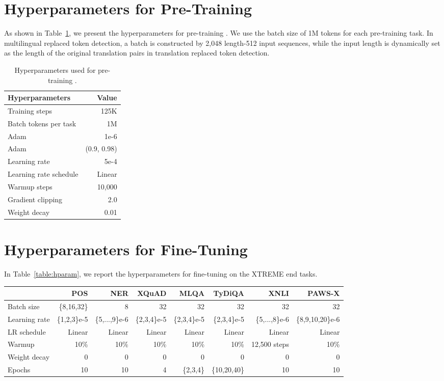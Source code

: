 \documentclass[11pt]{article}
\newcommand\our{\makebox{\textsc{XLM-E}}}
\begin{document}
\section{Hyperparameters for Pre-Training}
\label{appendix:params_pretrain}
As shown in Table~\ref{table:pt-hparam}, we present the hyperparameters for pre-training \our{}.
We use the batch size of 1M tokens for each pre-training task. In multilingual replaced token detection, a batch is constructed by 2,048 length-512 input sequences, while the input length is dynamically set as the length of the original translation pairs in translation replaced token detection.

\begin{table}[ht]
\centering
\small
\renewcommand\tabcolsep{3.5pt}
\begin{tabular}{lr}
\toprule
Hyperparameters & Value \\ \midrule
Training steps & 125K \\
Batch tokens per task & 1M \\
Adam  & 1e-6 \\
Adam  & (0.9, 0.98) \\
Learning rate & 5e-4 \\
Learning rate schedule & Linear \\
Warmup steps & 10,000 \\
Gradient clipping & 2.0 \\
Weight decay & 0.01 \\
\bottomrule
\end{tabular}
\caption{Hyperparameters used for pre-training \our{}.
}
\label{table:pt-hparam}
\end{table}


\section{Hyperparameters for Fine-Tuning}

In Table~\ref{table:hparam}, we report the hyperparameters for fine-tuning \our{} on the XTREME end tasks.

\begin{table*}[t]
\centering
\small
\begin{tabular}{lrrrrrrr}
\toprule
& POS & NER & XQuAD & MLQA & TyDiQA & XNLI & PAWS-X \\ \midrule
Batch size & \{8,16,32\} & 8 & 32 & 32 & 32 & 32 & 32 \\
Learning rate & \{1,2,3\}e-5 & \{5,...,9\}e-6 & \{2,3,4\}e-5 & \{2,3,4\}e-5 & \{2,3,4\}e-5 & \{5,...,8\}e-6 & \{8,9,10,20\}e-6 \\
LR schedule & Linear & Linear & Linear & Linear & Linear & Linear & Linear \\
Warmup & 10\% & 10\% & 10\% & 10\% & 10\% & 12,500 steps & 10\% \\
Weight decay & 0 & 0 & 0 & 0 & 0 & 0 & 0 \\
Epochs & 10 & 10 & 4 & \{2,3,4\} & \{10,20,40\} & 10 & 10\\
\bottomrule
\end{tabular}
\caption{Hyperparameters used for fine-tuning on the XTREME end tasks.}
\label{table:hparam}
\end{table*}
\end{document}
